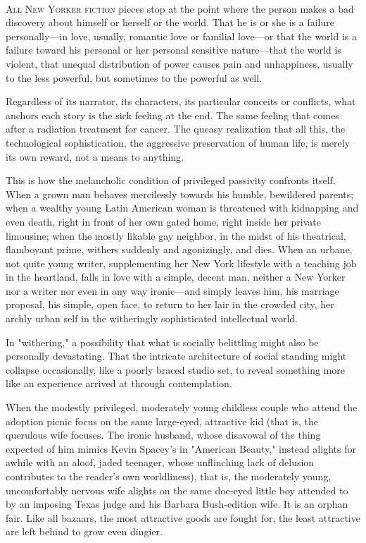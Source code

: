 \documentclass[
]{memoir}
\begin{document}
~

\lettrine[lines=3, findent=0em, nindent=0.1em, lhang=0]{A}{ll New Yorker fiction}
pieces stop at the point where the person makes a bad discovery about
himself or herself or the world. That he is or she is a failure
personally---in love, usually, romantic love or familial love---or that
the world is a failure toward his personal or her personal sensitive
nature---that the world is violent, that unequal distribution of power
causes pain and unhappiness, usually to the less powerful, but sometimes
to the powerful as well.

Regardless of its narrator, its characters, its particular conceits or
conflicts, what anchors each story is the sick feeling at the end. The
same feeling that comes after a radiation treatment for cancer. The
queasy realization that all this, the technological sophistication, the
aggressive preservation of human life, is merely its own reward, not a
means to anything.

This is how the melancholic condition of privileged passivity confronts
itself. When a grown man behaves mercilessly towards his humble,
bewildered parents; when a wealthy young Latin American woman is
threatened with kidnapping and even death, right in front of her own
gated home, right inside her private limousine; when the mostly likable
gay neighbor, in the midst of his theatrical, flamboyant prime, withers
suddenly and agonizingly, and dies. When an urbane, not quite young
writer, supplementing her New York lifestyle with a teaching job in the
heartland, falls in love with a simple, decent man, neither a New Yorker
nor a writer nor even in any way ironic---and simply leaves him, his
marriage proposal, his simple, open face, to return to her lair in the
crowded city, her archly urban self in the witheringly sophisticated
intellectual world.

In "withering," a possibility that what is socially belittling might
also be personally devastating. That the intricate architecture of
social standing might collapse occasionally, like a poorly braced studio
set, to reveal something more like an experience arrived at through
contemplation.

When the modestly privileged, moderately young childless couple who
attend the adoption picnic focus on the same large-eyed, attractive kid
(that is, the querulous wife focuses. The ironic husband, whose
disavowal of the thing expected of him mimics Kevin Spacey's in
"American Beauty," instead alights for awhile with an aloof, jaded
teenager, whose unflinching lack of delusion contributes to the reader's
own worldliness), that is, the moderately young, uncomfortably nervous
wife alights on the same doe-eyed little boy attended to by an imposing
Texas judge and his Barbara Bush-edition wife. It is an orphan fair.
Like all bazaars, the most attractive goods are fought for, the least
attractive are left behind to grow even dingier.
\end{document}

